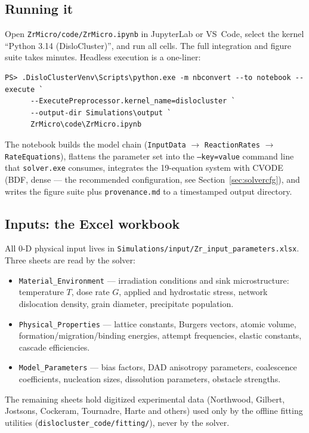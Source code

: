 \documentclass[11pt]{article}
\newcommand{\code}[1]{\texttt{\small #1}}
\newcommand{\file}[1]{\texttt{\footnotesize #1}}
\begin{document}
\subsection{Running it}

Open \file{ZrMicro/code/ZrMicro.ipynb} in JupyterLab or
VS~Code, select the kernel ``Python 3.14 (DisloCluster)'', and run all cells.
The full integration and figure suite takes minutes. Headless execution is a
one-liner:

\begin{lstlisting}[style=ps]
PS> .DisloClusterVenv\Scripts\python.exe -m nbconvert --to notebook --execute `
      --ExecutePreprocessor.kernel_name=dislocluster `
      --output-dir Simulations\output `
      ZrMicro\code\ZrMicro.ipynb
\end{lstlisting}

The notebook builds the model chain (\code{InputData} $\rightarrow$
\code{ReactionRates} $\rightarrow$ \code{RateEquations}), flattens the
parameter set into the \code{--key=value} command line that
\file{solver.exe} consumes, integrates the 19-equation system with CVODE
(BDF, dense --- the recommended configuration, see
Section~\ref{sec:solvercfg}), and writes the figure suite plus
\file{provenance.md} to a timestamped output directory.

\subsection{Inputs: the Excel workbook}

All 0-D physical input lives in
\file{Simulations/input/Zr\_input\_parameters.xlsx}. Three
sheets are read by the solver:

\begin{itemize}
\item \code{Material\_Environment} --- irradiation conditions and sink
microstructure: temperature $T$, dose rate $G$, applied and hydrostatic
stress, network dislocation density, grain diameter, precipitate population.
\item \code{Physical\_Properties} --- lattice constants, Burgers vectors,
atomic volume, formation/migration/binding energies, attempt frequencies,
elastic constants, cascade efficiencies.
\item \code{Model\_Parameters} --- bias factors, DAD anisotropy parameters,
coalescence coefficients, nucleation sizes, dissolution parameters, obstacle
strengths.
\end{itemize}

The remaining sheets hold digitized experimental data (Northwood, Gilbert,
Jostsons, Cockeram, Tournadre, Harte and others) used only by the offline
fitting utilities (\file{dislocluster\_code/fitting/}), never by the solver.
\end{document}
